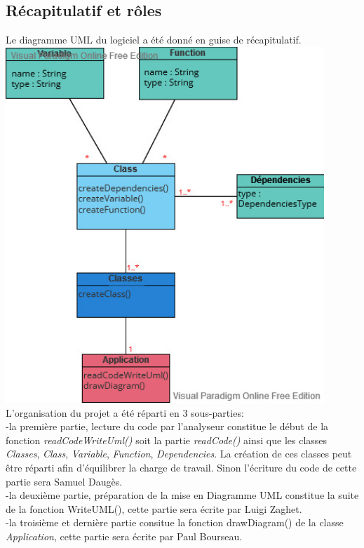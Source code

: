 \documentclass{article}
\begin{document}
\subsection{Récapitulatif et rôles}
Le diagramme UML du logiciel a été donné en guise de récapitulatif.\\
\includegraphics[width=12cm]{PdpUml.jpg}\\
L'organisation du projet a été réparti en 3 sous-parties:\\ -la première partie, lecture du code par l'analyseur constitue le début de la fonction \emph{readCodeWriteUml()} soit la partie \emph{readCode()} ainsi que les classes \emph{Classes}, \emph{Class}, \emph{Variable}, \emph{Function}, \emph{Dependencies}. La création de ces classes peut être réparti afin d'équilibrer la charge de travail. Sinon l'écriture du code de cette partie sera Samuel Daugès.\\
-la deuxième partie, préparation de la mise en Diagramme UML constitue la suite de la fonction WriteUML(), cette partie sera écrite par Luigi Zaghet.\\
-la troisième et dernière partie consitue la fonction drawDiagram() de la classe \emph{Application}, cette partie sera écrite par Paul Bourseau.\\
\end{document}
